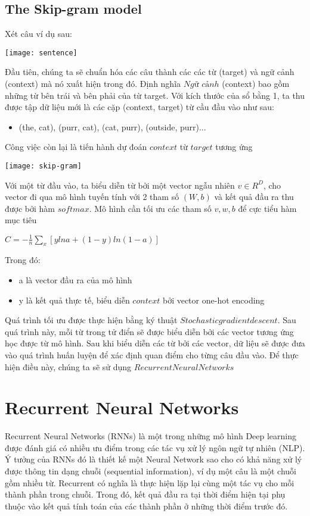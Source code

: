 \subsection{The Skip-gram model}
Xét câu ví dụ sau:
	\begin{center}
	  \texttt{[image: sentence]}
	  \label{sentence}
	\end{center} 
Đầu tiên, chúng ta sẽ chuẩn hóa các câu thành các các từ (target) và ngữ cảnh (context) mà nó xuất hiện trong đó. Định nghĩa $Ngữ$ $cảnh$ (context) bao gồm những từ bên trái và bên phải của từ target. Với kích thước của sổ bằng 1, ta thu được tập dữ liệu mới là các cặp (context, target) từ cầu đầu vào như sau:
	\begin{itemize}[label = \textbullet]
		\item (the, cat), (purr, cat), (cat, purr), (outside, purr)...
	\end{itemize} 
Công việc còn lại là tiến hành dự đoán $context$ từ $target$ tương ứng
	\begin{center}
	  \texttt{[image: skip-gram]}
	  \label{skip-gram}
	\end{center} 
Với một từ đầu vào, ta biểu diễn từ bởi một vector ngẫu nhiên $v \in R^{D}$, cho vector đi qua mô hình tuyến tính với 2 tham số $(W, b)$ và kết quả đầu ra thu được bởi hàm $softmax$. Mô hình cần tối ưu các tham số $v, w, b$ để cực tiểu hàm mục tiêu
	\begin{center}
		$C = -\frac{1}{n} \sum\limits_{x}{[ylna + (1-y)ln(1-a)]}$ \\
		
	\end{center}
	Trong đó:
		\begin{itemize}[label = \textbullet]
			\item a là vector đầu ra của mô hình
			\item y là kết quả thực tế, biểu diễn $context$ bởi vector one-hot encoding
		\end{itemize}
Quá trình tối ưu được thực hiện bằng ký thuật $Stochastic gradient descent$. Sau quá trình này, mỗi từ trong tử điển sẽ được biểu diễn bởi các vector tương ứng học được từ mô hình. Sau khi biểu diễn các từ bởi các vector, dữ liệu sẽ được đưa vào quá trình huấn luyện để xác định quan điểm cho từng câu đầu vào. Để thực hiện điều này, chúng ta sẽ sử dụng $Recurrent Neural Networks$
\section{Recurrent Neural Networks}
Recurrent Neural Networks (RNNs) là một trong những mô hình Deep learning được đánh giá có nhiều ưu điểm trong các tác vụ xử lý ngôn ngữ tự nhiên (NLP). Ý tưởng của RNNs đó là thiết kế một Neural Network sao cho có khả năng xử lý được thông tin dạng chuỗi (sequential information), ví dụ một câu là một chuỗi gồm nhiều từ. Recurrent có nghĩa là thực hiện lặp lại cùng một tác vụ cho mỗi thành phần trong chuỗi. Trong đó, kết quả đầu ra tại thời điểm hiện tại phụ thuộc vào kết quả tính toán của các thành phần ở những thời điểm trước đó.

